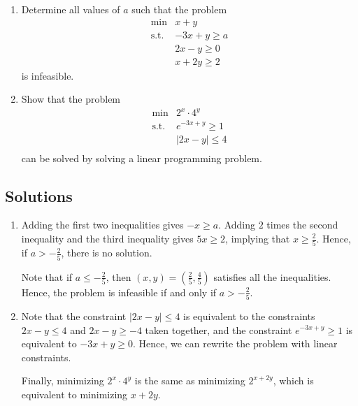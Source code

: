 \begin{enumerate}
\def\labelenumi{\arabic{enumi}.}
\item
  Determine all values of \(a\) such that the problem \[
  \begin{array}{rl}
  \min & x + y \\
  \text{s.t.} 
  &  -3x + y \geq a \\
  &  2x - y \geq 0 \\
  & x + 2y \geq 2
  \end{array}
  \] is infeasible.
\item
  Show that the problem \[
  \begin{array}{rl}
  \min & 2^x \cdot 4^y \\
  \text{s.t.} 
  &  e^{-3x + y} \geq 1 \\
  &  |2x - y| \leq 4 \\
  \end{array}
  \] can be solved by solving a linear programming problem.
\end{enumerate}

\subsection*{Solutions}\label{solutions-1}

\begin{enumerate}
\def\labelenumi{\arabic{enumi}.}
\item
  Adding the first two inequalities gives \(-x \geq a\). Adding \(2\)
  times the second inequality and the third inequality gives
  \(5x \geq 2\), implying that \(x \geq \frac{2}{5}\). Hence, if
  \(a \gt -\frac{2}{5}\), there is no solution.

  Note that if \(a \leq -\frac{2}{5}\), then
  \((x,y) = \left (\frac{2}{5}, \frac{4}{5}\right)\) satisfies all the
  inequalities. Hence, the problem is infeasible if and only if
  \(a \gt -\frac{2}{5}\).
\item
  Note that the constraint \(|2x - y| \leq 4\) is equivalent to the
  constraints \(2x-y\leq 4\) and \(2x-y \geq -4\) taken together, and
  the constraint \(e^{-3x+y} \geq 1\) is equivalent to \(-3x+y \geq 0\).
  Hence, we can rewrite the problem with linear constraints.

  Finally, minimizing \(2^x \cdot 4^y\) is the same as minimizing
  \(2^{x + 2y}\), which is equivalent to minimizing \(x+2y\).
\end{enumerate}
